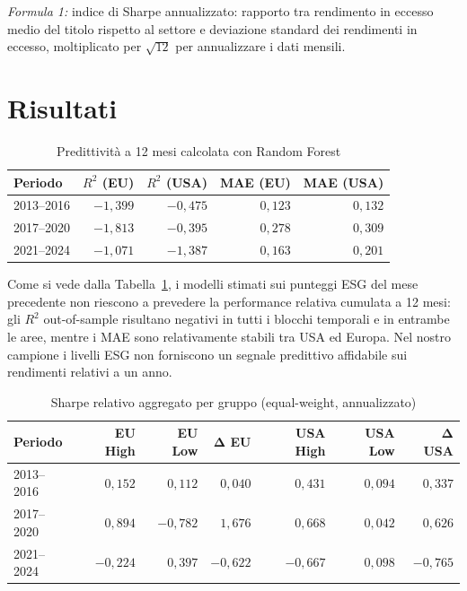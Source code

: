 \documentclass[12pt,a4paper]{article}
\begin{document}
\noindent\textit{Formula 1:} indice di Sharpe annualizzato: rapporto tra rendimento in eccesso medio del titolo rispetto al settore e deviazione standard dei rendimenti in eccesso, moltiplicato per $\sqrt{12}$ per annualizzare i dati mensili.

\section{Risultati}

\begin{table}[H]
\centering
\caption{Predittività a 12 mesi calcolata con Random Forest}
\label{tab:rf}
\small
\begin{tabular}{lrrrr}
\toprule
\textbf{Periodo} & \textbf{$R^2$ (EU)} & \textbf{$R^2$ (USA)} & \textbf{MAE (EU)} & \textbf{MAE (USA)} \\
\midrule
2013--2016 & $-1{,}399$ & $-0{,}475$ & $0{,}123$ & $0{,}132$ \\
2017--2020 & $-1{,}813$ & $-0{,}395$ & $0{,}278$ & $0{,}309$ \\
2021--2024 & $-1{,}071$ & $-1{,}387$ & $0{,}163$ & $0{,}201$ \\
\bottomrule
\end{tabular}
\end{table}

Come si vede dalla Tabella~\ref{tab:rf}, i modelli stimati sui punteggi ESG del mese precedente non riescono a prevedere la performance relativa cumulata a 12 mesi: gli $R^2$ out-of-sample risultano negativi in tutti i blocchi temporali e in entrambe le aree, mentre i MAE sono relativamente stabili tra USA ed Europa. Nel nostro campione i livelli ESG non forniscono un segnale predittivo affidabile sui rendimenti relativi a un anno.

\begin{table}[H]
\centering
\caption{Sharpe relativo aggregato per gruppo (equal-weight, annualizzato)}
\label{tab:sharpe}
\small
\begin{tabular}{lrrrrrr}
\toprule
\textbf{Periodo} & \textbf{EU High} & \textbf{EU Low} & $\boldsymbol{\Delta}$\textbf{ EU} & \textbf{USA High} & \textbf{USA Low} & $\boldsymbol{\Delta}$\textbf{ USA} \\
\midrule
2013--2016 & $0{,}152$ & $0{,}112$ & $0{,}040$ & $0{,}431$ & $0{,}094$ & $0{,}337$ \\
2017--2020 & $0{,}894$ & $-0{,}782$ & $1{,}676$ & $0{,}668$ & $0{,}042$ & $0{,}626$ \\
2021--2024 & $-0{,}224$ & $0{,}397$ & $-0{,}622$ & $-0{,}667$ & $0{,}098$ & $-0{,}765$ \\
\bottomrule
\end{tabular}
\end{table}
\end{document}
